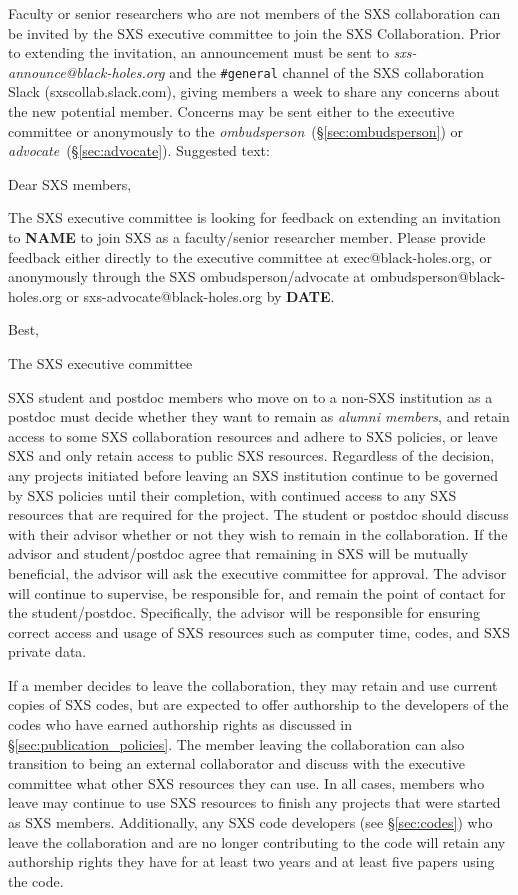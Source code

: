 \documentclass[12pt]{article}
\begin{document}
Faculty or senior researchers who are not members of the SXS
collaboration can be invited by the SXS executive committee to join
the SXS Collaboration.  Prior to extending the invitation, an
announcement must be sent to \emph{sxs-announce@black-holes.org} and
the \texttt{\#general} channel of the SXS collaboration Slack
(sxscollab.slack.com), giving members a week to share any concerns
about the new potential member.  Concerns may be sent either to the
executive committee or anonymously to the
\emph{ombudsperson}~(\S\ref{sec:ombudsperson}) or
\emph{advocate}~(\S\ref{sec:advocate}).  Suggested text:

\begin{displayquote}
  Dear SXS members,

  The SXS executive committee is looking for feedback on extending an
  invitation to \textbf{NAME} to join SXS as a faculty/senior
  researcher member.  Please provide feedback either directly to the
  executive committee at exec@black-holes.org, or anonymously through
  the SXS ombudsperson/advocate at ombudsperson@black-holes.org
  or sxs-advocate@black-holes.org by \textbf{DATE}.

  Best,

  The SXS executive committee
\end{displayquote}

SXS student and postdoc members who move on to a non-SXS institution
as a postdoc must decide whether they want to remain as \emph{alumni
  members}, and retain access to some SXS collaboration resources and
adhere to SXS policies, or leave SXS and only retain access to public
SXS resources.  Regardless of the decision, any projects initiated
before leaving an SXS institution continue to be governed by SXS
policies until their completion, with continued access to any SXS
resources that are required for the project.  The student or postdoc
should discuss with their advisor whether or not they wish to remain
in the collaboration.  If the advisor and student/postdoc agree that
remaining in SXS will be mutually beneficial, the advisor will ask the
executive committee for approval.  The advisor will continue to
supervise, be responsible for, and remain the point of contact for the
student/postdoc.  Specifically, the advisor will be responsible for
ensuring correct access and usage of SXS resources such as computer
time, codes, and SXS private data.

If a member decides to leave the collaboration, they may retain and
use current copies of SXS codes, but are expected to offer authorship
to the developers of the codes who have earned authorship rights as
discussed in \S\ref{sec:publication_policies}.  The member leaving the
collaboration can also transition to being an external collaborator
and discuss with the executive committee what other SXS resources they
can use.  In all cases, members who leave may continue to use SXS
resources to finish any projects that were started as SXS members.
Additionally, any SXS code developers (see \S\ref{sec:codes}) who
leave the collaboration and are no longer contributing to the code
will retain any authorship rights they have for at least two years and
at least five papers using the code.
\end{document}
